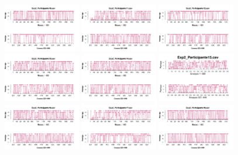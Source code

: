 \documentclass[a4paper ]{article}
\begin{document}
\begin{figure}[th]
\includegraphics[width=0.3\textwidth]{Figures/Rating_Exp2_P10} \includegraphics[width=0.3\textwidth]{Figures/Rating_Exp2_P11} \includegraphics[width=0.3\textwidth]{Figures/Rating_Exp2_P12}
\includegraphics[width=0.3\textwidth]{Figures/Rating_Exp2_P13} \includegraphics[width=0.3\textwidth]{Figures/Rating_Exp2_P14} \includegraphics[width=0.3\textwidth]{Figures/Rating_Exp2_P15}
\includegraphics[width=0.3\textwidth]{Figures/Rating_Exp2_P16} \includegraphics[width=0.3\textwidth]{Figures/Rating_Exp2_P17} \includegraphics[width=0.3\textwidth]{Figures/Rating_Exp2_P18}

\end{figure}
\end{document}
